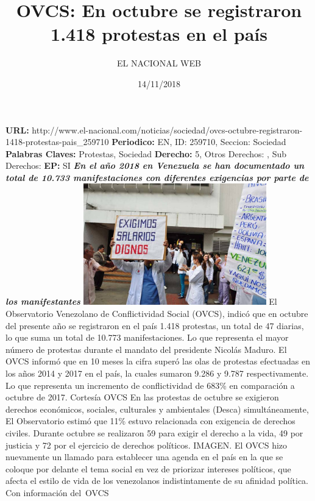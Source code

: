 \documentclass{article}%
\title{\textbf{OVCS: En octubre se registraron 1.418 protestas en el país}}%
\author{EL NACIONAL WEB}%
\date{14/11/2018}%
\begin{document}
%
\normalsize%
\maketitle%
\textbf{URL: }%
http://www.el{-}nacional.com/noticias/sociedad/ovcs{-}octubre{-}registraron{-}1418{-}protestas{-}pais\_259710\newline%
%
\textbf{Periodico: }%
EN, %
ID: %
259710, %
Seccion: %
Sociedad\newline%
%
\textbf{Palabras Claves: }%
Protestas, Sociedad\newline%
%
\textbf{Derecho: }%
5, %
Otros Derechos: %
, %
Sub Derechos: %
\newline%
%
\textbf{EP: }%
SI\newline%
\newline%
%
\textbf{\textit{En el año 2018 en Venezuela se han documentado un total de 10.733 manifestaciones con diferentes exigencias por parte de los manifestantes}}%
\newline%
\newline%
%
\includegraphics[width=300px]{184.jpg}%
\newline%
%
El Observatorio Venezolano de Conflictividad Social (OVCS), indicó que en octubre del presente año se registraron en el país 1.418 protestas, un total de 47 diarias, lo que suma un total de 10.773 manifestaciones. Lo que representa el mayor número de protestas durante el mandato del presidente Nicolás Maduro.%
\newline%
%
El OVCS informó que en 10 meses la cifra superó las olas de protestas efectuadas en los años 2014 y 2017 en el país, la cuales sumaron 9.286 y 9.787 respectivamente. Lo que representa un incremento de conflictividad de 683\% en comparación a octubre de 2017.%
\newline%
%
Cortesía OVCS%
\newline%
%
En las protestas de octubre se exigieron derechos económicos, sociales, culturales y ambientales (Desca) simultáneamente, El Observatorio estimó que 11\% estuvo relacionada con exigencia de derechos civiles. Durante octubre se realizaron 59 para exigir el derecho a la vida, 49 por justicia y 72 por el ejercicio de derechos políticos. IMAGEN.%
\newline%
%
El OVCS hizo nuevamente un llamado para establecer una agenda en el país en la que se coloque por delante el tema social en vez de priorizar intereses políticos, que afecta el estilo de vida de los venezolanos indistintamente de su afinidad política.%
\newline%
%
Con información del~OVCS%
\newline%
%
\end{document}
